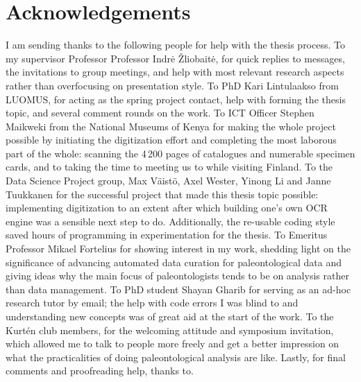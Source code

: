 \documentclass[english,twoside,openright]{UH_DS_MSc}
\begin{document}
\chapter{Acknowledgements}

I am sending thanks to the following people for help with the thesis process.
To my supervisor Professor Professor Indr{\.e} \v{Z}liobait{\.e}, for quick replies to messages, the invitations to group meetings, and help with most relevant research aspects rather than overfocusing on presentation style.
To PhD Kari Lintulaakso from LUOMUS, for acting as the spring project contact, help with forming the thesis topic, and several comment rounds on the work.
To ICT Officer Stephen Maikweki from the National Museums of Kenya for making the whole project possible by initiating the digitization effort and completing the most laborous part of the whole: scanning the 4\,200 pages of catalogues and numerable specimen cards, and to taking the time to meeting us to while visiting Finland.
To the Data Science Project group, Max V\"{a}ist\"{o}, Axel Wester, Yinong Li and Janne Tuukkanen for the successful project that made this thesis topic possible: implementing digitization to an extent after which building one's own OCR engine was a sensible next step to do. Additionally, the re-usable coding style saved hours of programming in experimentation for the thesis.
To Emeritus Professor Mikael Fortelius for showing interest in my work, shedding light on the significance of advancing automated data curation for paleontological data and giving ideas why the main focus of paleontologists tends to be on analysis rather than data management.
To PhD student Shayan Gharib for serving as an ad-hoc research tutor by email; the help with code errors I was blind to and understanding new concepts was of great aid at the start of the work.
To the Kurt\'{e}n club members, for the welcoming attitude and symposium invitation, which allowed me to talk to people more freely and get a better impression on what the practicalities of doing paleontological analysis are like.
Lastly, for final comments and proofreading help, thanks to.

\cleardoublepage %


\end{document}
